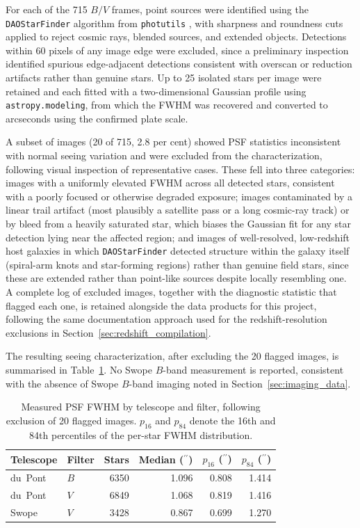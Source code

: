 \documentclass[12pt]{article}
\newcommand{\arcsec}{\ensuremath{^{\prime\prime}}}
\begin{document}
For each of the 715 $B/V$ frames, point sources were identified using the \texttt{DAOStarFinder} algorithm from \texttt{photutils} \citep{Bradley2019}, with sharpness and roundness cuts applied to reject cosmic rays, blended sources, and extended objects. Detections within 60 pixels of any image edge were excluded, since a preliminary inspection identified spurious edge-adjacent detections consistent with overscan or reduction artifacts rather than genuine stars. Up to 25 isolated stars per image were retained and each fitted with a two-dimensional Gaussian profile using \texttt{astropy.modeling}, from which the FWHM was recovered and converted to arcseconds using the confirmed plate scale.

A subset of images (20 of 715, 2.8 per cent) showed PSF statistics inconsistent with normal seeing variation and were excluded from the characterization, following visual inspection of representative cases. These fell into three categories: images with a uniformly elevated FWHM across all detected stars, consistent with a poorly focused or otherwise degraded exposure; images contaminated by a linear trail artifact (most plausibly a satellite pass or a long cosmic-ray track) or by bleed from a heavily saturated star, which biases the Gaussian fit for any star detection lying near the affected region; and images of well-resolved, low-redshift host galaxies in which \texttt{DAOStarFinder} detected structure within the galaxy itself (spiral-arm knots and star-forming regions) rather than genuine field stars, since these are extended rather than point-like sources despite locally resembling one. A complete log of excluded images, together with the diagnostic statistic that flagged each one, is retained alongside the data products for this project, following the same documentation approach used for the redshift-resolution exclusions in Section~\ref{sec:redshift_compilation}.

The resulting seeing characterization, after excluding the 20 flagged images, is summarised in Table~\ref{tab:psf_summary}. No Swope $B$-band measurement is reported, consistent with the absence of Swope $B$-band imaging noted in Section~\ref{sec:imaging_data}.

\begin{table}[h]
\centering
\caption{Measured PSF FWHM by telescope and filter, following exclusion of 20 flagged images. $p_{16}$ and $p_{84}$ denote the 16th and 84th percentiles of the per-star FWHM distribution.}
\label{tab:psf_summary}
\begin{tabular}{llrrrr}
\toprule
Telescope & Filter & Stars & Median (\arcsec) & $p_{16}$ (\arcsec) & $p_{84}$ (\arcsec) \\
\midrule
du~Pont & $B$ & 6350 & 1.096 & 0.808 & 1.414 \\
du~Pont & $V$ & 6849 & 1.068 & 0.819 & 1.416 \\
Swope   & $V$ & 3428 & 0.867 & 0.699 & 1.270 \\
\bottomrule
\end{tabular}
\end{table}
\end{document}
